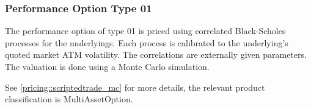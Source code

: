 \subsubsection{Performance Option Type 01}
\label{pricing::performanceoption_01}

The performance option of type 01 is priced using correlated Black-Scholes processes for the underlyings. Each process
is calibrated to the underlying's quoted market ATM volatility. The correlations are externally given parameters. The
valuation is done using a Monte Carlo simulation.

See \ref{pricing::scriptedtrade_mc} for more details, the relevant product classification is MultiAssetOption.
